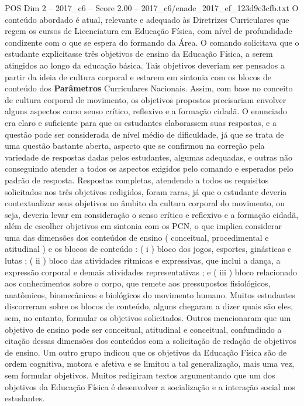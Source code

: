\begin{textsample}{POS Dim 2 – 2017\_c6 – Score 2.00 – 2017\_c6/enade\_2017\_ef\_123d9e3cfb.txt}
O conteúdo abordado é atual, relevante e adequado às Diretrizes Curriculares que regem os cursos de Licenciatura em Educação Física, com nível de profundidade condizente com o que se espera do formando da Área.
O comando solicitava que o estudante explicitasse três objetivos de ensino da Educação Física, a serem atingidos ao longo da educação básica.
Tais objetivos deveriam ser pensados a partir da ideia de cultura corporal e estarem em sintonia com os blocos de conteúdo dos \textbf{Parâmetros} Curriculares Nacionais.
Assim, com base no conceito de cultura corporal de movimento, os objetivos propostos precisariam envolver alguns aspectos como senso crítico, reflexivo e a formação cidadã.
O enunciado era claro e suficiente para que os estudantes elaborassem suas respostas, e a questão pode ser considerada de nível médio de dificuldade, já que se trata de uma questão bastante aberta, aspecto que se confirmou na correção pela variedade de respostas dadas pelos estudantes, algumas adequadas, e outras não conseguindo atender a todos os aspectos exigidos pelo comando e esperados pelo padrão de resposta.
Respostas completas, atendendo a todos os requisitos solicitados nos três objetivos redigidos, foram raras, já que o estudante deveria contextualizar seus objetivos no âmbito da cultura corporal do movimento, ou seja, deveria levar em consideração o senso crítico e reflexivo e a formação cidadã, além de escolher objetivos em sintonia com os PCN, o que implica considerar uma das dimensões dos conteúdos de ensino ( conceitual, procedimental e atitudinal ) e os blocos de conteúdo : ( i ) bloco dos jogos, esportes, ginásticas e lutas ; ( ii ) bloco das atividades rítmicas e expressivas, que inclui a dança, a expressão corporal e demais atividades representativas ; e ( iii ) bloco relacionado aos conhecimentos sobre o corpo, que remete aos pressupostos fisiológicos, anatômicos, biomecânicos e biológicos do movimento humano.
Muitos estudantes discorreram sobre os blocos de conteúdo, alguns chegaram a dizer quais são eles, sem, no entanto, formular os objetivos solicitados.
Outros mencionaram que um objetivo de ensino pode ser conceitual, atitudinal e conceitual, confundindo a citação dessas dimensões dos conteúdos com a solicitação de redação de objetivos de ensino.
Um outro grupo indicou que os objetivos da Educação Física são de ordem cognitiva, motora e afetiva e se limitou a tal generalização, mais uma vez, sem formular objetivos.
Muitos redigiram textos argumentando que um dos objetivos da Educação Física é desenvolver a socialização e a interação social nos estudantes.

\end{textsample}
